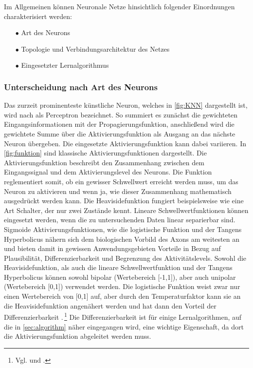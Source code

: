 Im Allgemeinen können Neuronale Netze hinsichtlich folgender Einordnungen charakterisiert werden:\,
\begin{itemize}
\item[\textbf{$\bullet$}] Art des Neurons

\item[\textbf{$\bullet$}] Topologie und Verbindungsarchitektur des Netzes

\item[\textbf{$\bullet$}] Eingesetzter Lernalgorithmus
\end{itemize}

\subsubsection{Unterscheidung nach Art des Neurons}

Das zurzeit prominenteste künstliche Neuron, welches in \autoref{fig:KNN} dargestellt ist, wird nach \citet{perceptron_ros58} als Perceptron bezeichnet. So summiert es zunächst die gewichteten Eingangsinformationen mit der Propagierungsfunktion, anschließend wird die gewichtete Summe über die Aktivierungsfunktion als Ausgang an das nächste Neuron übergeben. Die eingesetzte Aktivierungsfunktion kann dabei variieren. In \autoref{fig:funktion} sind klassische Aktivierungsfunktionen dargestellt. Die Aktivierungsfunktion beschreibt den Zusammenhang zwischen dem Eingangssignal und dem Aktivierungslevel des Neurons. Die Funktion reglementiert somit, ob ein gewisser Schwellwert erreicht werden muss, um das Neuron zu aktivieren und wenn ja, wie dieser Zusammenhang mathematisch ausgedrückt werden kann. Die Heavisidefunktion fungiert beispielsweise wie eine Art Schalter, der nur zwei Zustände kennt. Lineare Schwellwertfunktionen können eingesetzt werden, wenn die zu untersuchenden Daten linear separierbar sind. Sigmoide Aktivierungsfunktionen, wie die logistische Funktion und der Tangens Hyperbolicus nähern sich dem biologischen Vorbild des Axons am weitesten an und bieten damit in gewissen Anwendungsgebieten Vorteile in Bezug auf Plausibilität, Differenzierbarkeit und Begrenzung des Aktivitätslevels. Sowohl die Heavisidefunktion, als auch die lineare Schwellwertfunktion und der Tangens Hyperbolicus können sowohl bipolar (Wertebereich [-1,1]), aber auch unipolar (Wertebereich [0,1]) verwendet werden. Die logistische Funktion weist zwar nur einen Wertebereich von [0,1] auf, aber durch den Temperaturfaktor kann sie an die Heavisidefunktion angenähert werden und hat dann den Vorteil der Differenzierbarkeit .\,\footnote{Vgl. \citet[5]{neuralnet_intro} und \citet[39 f]{dkriesel07}.} Die Differenzierbarkeit ist für einige Lernalgorithmen, auf die in \autoref{sec:algorithm} näher eingegangen wird, eine wichtige Eigenschaft, da dort die Aktivierungsfunktion abgeleitet werden muss.

